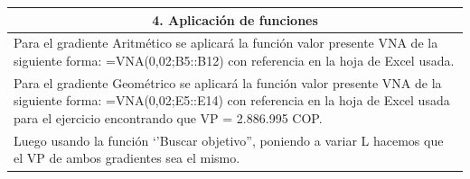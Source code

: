 \begin{center}
\begin{longtable}[H]{|p{0.333\linewidth}|p{0.3333\linewidth}|p{0.3333\linewidth}|}
    \multicolumn{3}{|c|}{\cellcolor[HTML]{FFB183}\textbf{4. Aplicación de funciones}}                  \\ \hline
    \multicolumn{3}{|p{\columnwidth}|}{Para el gradiente Aritmético se aplicará la función valor presente VNA de la siguiente forma: \newline
    =VNA(0,02;B5::B12) con referencia en la hoja de Excel usada.}                                      \\
    \multicolumn{3}{|p{\columnwidth}|}{Para el gradiente Geométrico se aplicará la función valor presente VNA de la siguiente forma: \newline
    =VNA(0,02;E5::E14) con referencia en la hoja de Excel usada para
    el ejercicio encontrando que VP = 2.886.995 COP.}                                                  \\
    \multicolumn{3}{|p{\columnwidth}|}{Luego usando la función ‘’Buscar objetivo”, poniendo a variar L hacemos que el VP de ambos
    gradientes sea el mismo.}                                                                          \\

\end{longtable}
\end{center}

